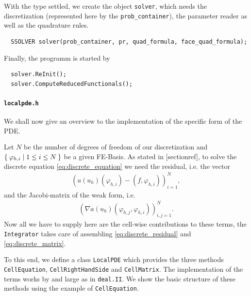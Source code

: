 \documentclass[prodmode,acmtoms]{acmsmall}
\numberwithin{equation}{section}
\renewcommand{\phi}{\varphi}
\newcommand{\deal}{\texttt{deal.II}}
\begin{document}
With the type settled, we create the object \texttt{solver}, which needs the discretization (represented here by the \texttt{prob\_container}), the parameter reader as well as the quadrature rules.
\begin{lstlisting}
  SSOLVER solver(prob_container, pr, quad_formula, face_quad_formula);
\end{lstlisting}
Finally, the programm is started by
\begin{lstlisting}
  solver.ReInit();
  solver.ComputeReducedFunctionals();
\end{lstlisting}

\paragraph{\texttt{localpde.h}}
We shall now give an overview to the implementation of the specific form of the PDE. 

Let $N$ be the number of degrees of freedom of our discretization and $\Set{\phi_{h,i}|1\leq i \leq N}$ be a given FE-Basis. As stated in [sectionref], to solve the discrete equation \eqref{eq:discrete_equation} we need the residual, i.e. the vector
\begin{align}\label{eq:discrete_residual}
\left(a(u_h)(\phi_{h,i})-(f,\phi_{h,i})\right)_{i=1}^N,
\end{align}
and the Jacobi-matrix of the weak form, i.e.
\begin{align}\label{eq:discrete_matrix}
\left(\nabla a(u_h)(\phi_{h,j},\phi_{h,i})\right)_{i,j=1}^N.
\end{align}
Now all we have to supply here are the cell-wise contributions to these terms, the \texttt{Integrator} takes care of assembling \eqref{eq:discrete_residual} and \eqref{eq:discrete_matrix}.

To this end, we define a class \texttt{LocalPDE} which provides the three methods
\texttt{CellEquation}, \texttt{CellRightHandSide} and \texttt{CellMatrix}. The implementation of the terms works by and large as in \deal{}. We show the basic structure of these methods using the example of \texttt{CellEquation}.
\end{document}
